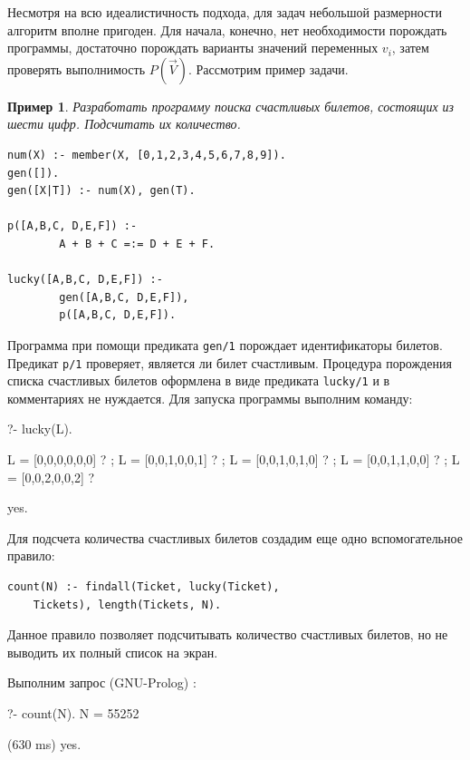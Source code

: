 \documentclass[a4paper,14pt, openany, twoside, final]{extbook} %
\newtheorem{example}{Пример}[chapter]
\begin{document}
Несмотря на всю идеалистичность подхода, для задач небольшой размерности алгоритм вполне пригоден. Для начала, конечно, нет необходимости порождать программы, достаточно порождать варианты значений переменных $v_i$, затем проверять выполнимость $P(\vec{V})$. Рассмотрим пример задачи.

\begin{example}
Разработать программу поиска счастливых билетов, состоящих из шести цифр. Подсчитать их количество.\enlargethispage{-1em}
\end{example}

\begin{verbatim}
num(X) :- member(X, [0,1,2,3,4,5,6,7,8,9]).
gen([]).
gen([X|T]) :- num(X), gen(T).

p([A,B,C, D,E,F]) :-
        A + B + C =:= D + E + F.

lucky([A,B,C, D,E,F]) :-
        gen([A,B,C, D,E,F]),
        p([A,B,C, D,E,F]).
\end{verbatim}

Программа при помощи предиката \texttt{gen/1} порождает идентификаторы билетов. Предикат \texttt{p/1} проверяет, является ли билет счастливым. Процедура порождения списка счастливых билетов оформлена в виде предиката \texttt{lucky/1} и в комментариях не нуждается. Для запуска программы выполним команду:

\begin{proexp}
?- lucky(L).

L = [0,0,0,0,0,0] ? ;
L = [0,0,1,0,0,1] ? ;
L = [0,0,1,0,1,0] ? ;
L = [0,0,1,1,0,0] ? ;
L = [0,0,2,0,0,2] ?

yes.
\end{proexp}

\noindent{}Для подсчета количества счастливых билетов создадим еще одно вспомогательное правило:

\begin{verbatim}
count(N) :- findall(Ticket, lucky(Ticket),
    Tickets), length(Tickets, N).
\end{verbatim}

\noindent{}Данное правило позволяет подсчитывать количество счастливых билетов, но не выводить их полный список на экран.

Выполним запрос (GNU-Prolog) \cite{GNUP}:

\begin{proexp}
?- count(N).
N = 55252

(630 ms) yes.
\end{proexp}
\end{document}
